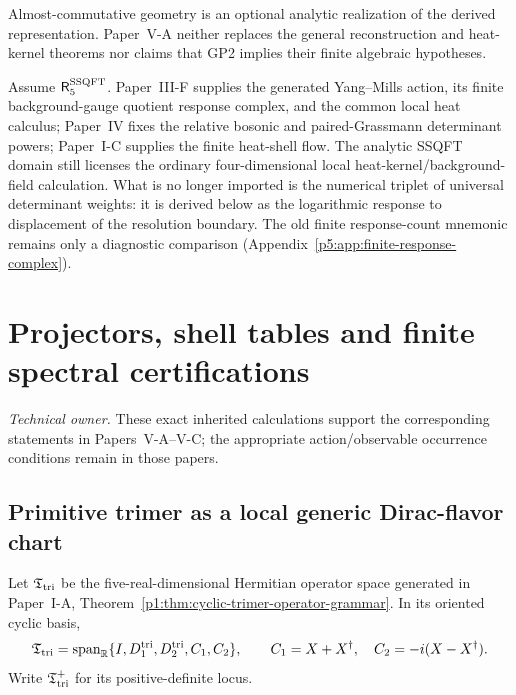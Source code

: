 \documentclass[11pt,a4paper]{article}
\begin{document}
\begin{remark}
\label{p5:rem:ncg-theorem-use-firewall}
\label{p5:rem:ccm-novelty-boundary}
\label{p5:rem:ncg-inner-fluctuation-priority-boundary}
Almost-commutative geometry is an optional analytic realization of the
derived representation.  Paper~V-A neither replaces the general
reconstruction and heat-kernel theorems nor claims that GP2 implies their
finite algebraic hypotheses.
\end{remark}

\label{p5:part:qft-bridge}

Assume \(\mathsf R_5^{\rm SSQFT}\).  Paper~III-F supplies the generated
Yang--Mills action, its finite background-gauge quotient response complex, and
the common local heat calculus; Paper~IV fixes the relative bosonic and
paired-Grassmann determinant powers; Paper~I-C supplies the finite heat-shell
flow.  The analytic SSQFT domain still licenses the ordinary four-dimensional
local heat-kernel/background-field calculation.  What is no longer imported
is the numerical triplet of universal determinant weights: it is derived
below as the logarithmic response to displacement of the resolution boundary.
The old finite response-count mnemonic remains only a diagnostic comparison
(Appendix~\ref{p5:app:finite-response-complex}).


\section{Projectors, shell tables and finite spectral certifications}
\label{p5d:sec:C}
\noindent\textit{Technical owner.} These exact inherited calculations
support the corresponding statements in Papers~V-A--V-C;
the appropriate action/observable occurrence conditions remain in those papers.
\subsection{Primitive trimer as a local generic Dirac-flavor chart}
\label{p6:sec:v548-trimer-flavor-chart}

Let $\mathfrak T_{\rm tri}$ be the five-real-dimensional Hermitian operator
space generated in Paper~I-A,
Theorem~\ref{p1:thm:cyclic-trimer-operator-grammar}.  In its oriented cyclic
basis,
\[
 \mathfrak T_{\rm tri}
 =\operatorname{span}_{\mathbb{R}}\{I,D^{\mathrm{tri}}_1,D^{\mathrm{tri}}_2,C_1,C_2\},
 \qquad
 C_1=X+X^\dagger,
 \quad C_2=-i(X-X^\dagger).
\]
Write $\mathfrak T_{\rm tri}^{+}$ for its positive-definite locus.
\end{document}

